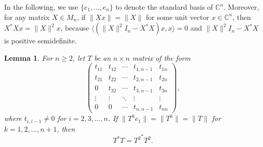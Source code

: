 \documentclass[11pt]{article}
\newtheorem{lemma}[theorem]{Lemma}
\numberwithin{equation}{section}
\def\IC{{\mathbb C}}
\begin{document}
In the following, we use $\{e_1, \dots, e_n\}$ to denote the standard basis of $\IC^n$. Moreover, for any matrix $X\in M_n$, if $\|Xx\|=\|X\|$ for some unit vector $x\in\IC^n$, then $X^*Xx=\|X\|^2x$, because $\langle(\|X\|^2I_n-X^*X)x,x\rangle=0$ and $\|X\|^2I_n-X^*X$ is positive semidefinite.


\begin{lemma}\label{l46}
For $n\ge 2$, let $T$ be an $n\times n$ matrix of the form
\[
\begin{pmatrix}
t_{11} & t_{12} & \cdots & t_{1, n-1} & t_{1n}\\
t_{21} & t_{22} & \cdots & t_{2, n-1} & t_{2n}\\
0      & t_{32} & \cdots & t_{3, n-1} & t_{3n}\\
\vdots & \vdots & \ddots & \vdots     & \vdots \\
0      & 0      & \cdots & t_{n, n-1} & t_{nn}
\end{pmatrix},
\]
where $t_{i, i-1}\neq 0$ for $i=2,3,\ldots,n$.
If $\| T^{k}e_{1} \|= \| T^{k} \|= \| T \|$ for $k=1,2,\ldots, n+1$, then
\[
T^*T = {T^2}^*T^{2}.
\]
\end{lemma}
\end{document}
